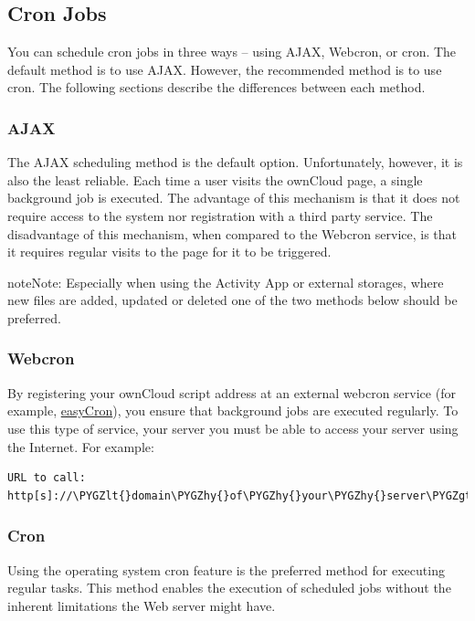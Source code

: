\documentclass[letterpaper,10pt,english]{sphinxmanual}
\def\PYGZlt{\char`\<}
\def\PYGZgt{\char`\>}
\def\PYGZhy{\char`\-}
\begin{document}
\subsection{Cron Jobs}
\label{configuration_server/background_jobs_configuration:cron-jobs}
You can schedule cron jobs in three ways -- using AJAX, Webcron, or cron. The default method is to use AJAX.  However, the recommended method is to use cron.  The following sections describe the differences between each method.


\subsubsection{AJAX}
\label{configuration_server/background_jobs_configuration:ajax}
The AJAX scheduling method is the default option.  Unfortunately, however, it is also the least reliable. Each time a user visits the ownCloud page, a single background job is executed. The advantage of this mechanism is that it does not require access to the system nor registration with a third party service. The disadvantage of this mechanism, when compared to the Webcron service, is that it requires regular visits to the page for it to be triggered.

\begin{notice}{note}{Note:}
Especially when using the Activity App or external storages, where new
files are added, updated or deleted one of the two methods below should be
preferred.
\end{notice}


\subsubsection{Webcron}
\label{configuration_server/background_jobs_configuration:webcron}
By registering your ownCloud  script address at an external webcron
service (for example, \href{http://www.easycron.com/}{easyCron}), you ensure that background jobs are executed
regularly. To use this type of service, your server you must be able to access
your server using the Internet. For example:

\begin{Verbatim}[commandchars=\\\{\}]
URL to call: http[s]://\PYGZlt{}domain\PYGZhy{}of\PYGZhy{}your\PYGZhy{}server\PYGZgt{}/owncloud/cron.php
\end{Verbatim}


\subsubsection{Cron}
\label{configuration_server/background_jobs_configuration:cron}
Using the operating system cron feature is the preferred method for executing regular tasks.  This method enables the execution of scheduled jobs without the inherent limitations the Web server might have.
\end{document}
